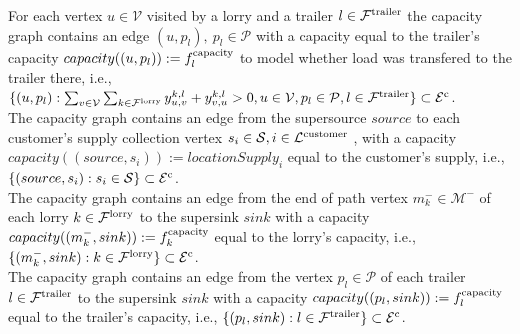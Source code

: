 

For each vertex
$u \in \mathcal V$
visited by a lorry and a trailer
$l \in \mathcal F^{\rm trailer} $
the capacity graph contains an edge
$ (u, p_l), \ p_l \in \mathcal P  $
with a capacity equal to the trailer's capacity
$ capacity((u,p_l)) := f^{\rm capacity}_l$
to model whether load was transfered to the trailer there, i.e.,
$\{ (u,p_l):
\sum_{v \in \mathcal V}\sum_{k \in \mathcal F^{\rm lorry}} y^{k,l}_{u,v} + y^{k,l}_{v,u} > 0,
u \in \mathcal V, p_l \in \mathcal P,  l \in \mathcal F^{\rm trailer} \} \subset \mathcal E^{\rm c}$. \\

The capacity graph  contains an edge from the supersource
$source$
to each customer's supply collection vertex
$s_i \in \mathcal S, i \in \mathcal L^{\rm customer }$ ,
with a capacity
$ capacity((source,s_i)) := locationSupply_{i} $
equal to the customer's supply,
i.e.,
$ \{ (source,s_i): s_i \in \mathcal S\} \subset \mathcal E^{\rm c}$. \\

The capacity graph  contains an edge  from the end of path vertex
$m^-_k \in \mathcal M^-$
of each lorry
$ k \in \mathcal F^{\rm lorry}$
to the supersink
$sink$
with a capacity
$ capacity((m^-_k ,sink)) := f^{\rm capacity}_k $
equal to the lorry's capacity,
i.e.,
$ \{ (m^-_k ,sink): k \in \mathcal F^{\rm lorry}  \} \subset \mathcal E^{\rm c}$. \\


The capacity graph  contains an edge from the vertex
$p_l \in \mathcal P$
of each trailer
$ l \in \mathcal F^{\rm trailer}$
to the supersink
$sink$
with a capacity
$ capacity((p_l ,sink)) := f^{\rm capacity}_l $
equal to the trailer's capacity,
i.e.,
$ \{ (p_l ,sink): l \in \mathcal F^{\rm trailer}  \} \subset \mathcal E^{\rm c}$.\\

